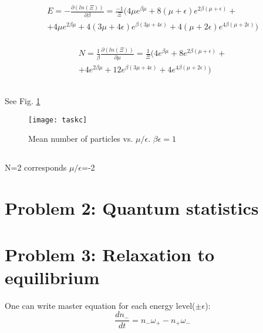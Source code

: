 \documentclass[10pt]{article}
\begin{document}
\begin{align}
\begin{split}
E = -\frac{\partial(ln(\Xi))}{\partial \beta} = \frac{-1}{\Xi} (4\mu e^{\beta \mu} + 8( \mu + \epsilon)e^{2\beta( \mu + \epsilon)} + \\
+ 4\mu e^{2\beta \mu} + 4(3\mu + 4\epsilon)e^{\beta(3\mu + 4\epsilon)} + 4( \mu + 2\epsilon)e^{4\beta( \mu + 2\epsilon)})
\label{eg:taskb:energy}
\end{split}
\end{align}


\begin{align}
\begin{split}
N = \frac{1}{\beta}\frac{\partial(ln(\Xi))}{\partial \mu} = \frac{1}{\Xi} (4e^{\beta \mu} + 8e^{2\beta( \mu + \epsilon)} + \\
+ 4e^{2\beta \mu} + 12e^{\beta(3\mu + 4\epsilon)} + 4e^{4\beta( \mu + 2\epsilon)})
\label{eg:taskb:numpart}
\end{split}
\end{align}


\subsection{}
See Fig. \ref{fig:taskc}

\begin{figure}
  \begin{center}
    \texttt{[image: taskc]}
    \caption {Mean number of particles vs. $\mu/\epsilon$. $\beta \epsilon=1$}
    \label{fig:taskc}
  \end{center}
\end{figure}


\subsection{}
N=2 corresponds $\mu/\epsilon$=-2
\section{Problem 2: Quantum statistics}
\section{Problem 3: Relaxation to equilibrium}
One can write master equation for each energy level($\pm \epsilon$):
\begin{equation}\label{minus}
\frac{d n_{-}}{dt} = n_{-} \omega_{+} - n_{+} \omega_{-}
\end{equation}
\end{document}
